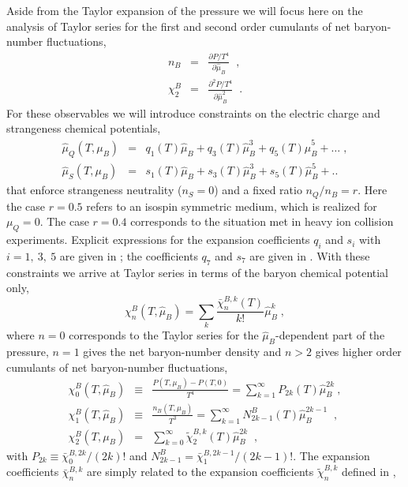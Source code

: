 \documentclass[pdflatex,prd,twocolumn,showpacs,superscriptaddress,nofootinbib]{revtex4-1}
\newcommand \hmu {\hat{\mu}}
\newcommand \cb {\bar{\chi}}
\begin{document}
Aside from the Taylor expansion of the pressure
we will focus here on the analysis of Taylor
series for the first and second order cumulants
of net baryon-number fluctuations,
\begin{eqnarray}
n_B &=& \frac{\partial P/T^4}{\partial \hmu_B }
\;\;  , \label{nX} \\
\chi_2^B &=& \frac{\partial^2 P/T^4}{\partial \hmu_B^2 }  \;\; .
\label{chiX}
\end{eqnarray}
For these observables we will introduce
constraints on the electric charge and strangeness chemical potentials, \cite{Bazavov:2017dus,Bazavov:2020bjn} 
\begin{eqnarray}
        \hat{\mu}_Q(T,\mu_B) &=& q_1(T)\hat{\mu}_B + q_3(T) \hat{\mu}_B^3+q_5(T) \hat{\mu}_B^5+ \dots \; , \nonumber \\
        \hat{\mu}_S(T,\mu_B) &=& s_1(T)\hat{\mu}_B + s_3(T) \hat{\mu}_B^3+s_5(T) \hat{\mu}_B^5 +..  
\label{qs}
\end{eqnarray}
that enforce
strangeness neutrality ($n_S=0$) and a fixed
ratio $n_Q/n_B=r$. Here the case $r=0.5$ refers to an isospin symmetric medium, which is realized for $\mu_Q=0$. The case $r=0.4$ corresponds to the 
situation met in heavy ion collision experiments.
Explicit expressions for the expansion coefficients $q_i$ and $s_i$ with $i=1,\ 3,\ 5$ are given in \cite{Bazavov:2017dus}; the coefficients $q_7$ and $s_7$ 
are given in \cite{Bazavov:2020bjn}.
With these constraints we arrive at Taylor series in terms of the baryon chemical potential only,
\begin{equation}
    \chi_n^B(T,\hmu_B) =\sum_{k}\frac{\cb_n^{B,k}(T)}{k!}\hmu_B^k \; ,
\end{equation}
where $n=0$ corresponds to the Taylor series
for the $\hmu_B$-dependent part of the pressure, $n=1$ gives the net baryon-number density and $n>2$ gives higher order cumulants of net baryon-number fluctuations,
\begin{eqnarray}
\chi_0^B(T,\hmu_B)&\equiv&  \frac{P(T,\mu_B)-P(T,0)}{T^4} =
\sum_{k=1}^{\infty} P_{2k}(T) \hmu_B^{2k} \ ,
\label{Pn} \\
\chi_1^B(T,\hmu_B)&\equiv& \frac{n_B(T,\mu_B)}{T^3} =
\sum_{k=1}^{\infty} N_{2k-1}^B(T) \hmu_B^{2k-1}\;\; , \label{nXneutral}\\
\chi_2^B(T,\mu_B) &=& \sum_{k=0}^{\infty} \tilde{\chi}_2^{B,k}(T) \hmu_B^{2k} 
\;\; ,
\label{chineutral}
\end{eqnarray}
with $P_{2k}\equiv \cb_0^{B,2k}/(2k)!$ and
$N_{2k-1}^B=\cb_1^{B,2k-1}/(2k-1)!$. 
The expansion coefficients $\cb_n^{B,k}$ are simply related to the expansion coefficients $\tilde{\chi}_n^{B,k}$ defined in \cite{Bazavov:2020bjn},
\end{document}
